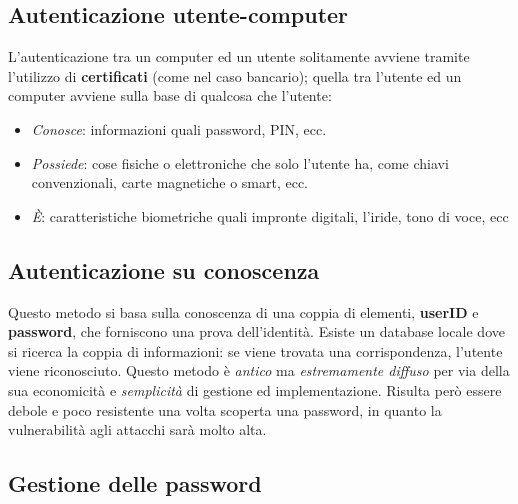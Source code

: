 \subsection{Autenticazione utente-computer}

L’autenticazione tra un computer ed un utente solitamente avviene tramite
l’utilizzo di \textbf{certificati} (come nel caso bancario); quella tra l’utente
ed un computer avviene sulla base di qualcosa che l’utente:

\begin{itemize}
      \item \textit{Conosce}: informazioni quali password, PIN, ecc.
      \item \textit{Possiede}: cose fisiche o elettroniche che solo l’utente ha,
            come chiavi convenzionali, carte magnetiche o smart, ecc.
      \item \textit{È}: caratteristiche biometriche quali
            impronte digitali, l’iride, tono di voce, ecc
\end{itemize}

\subsection{Autenticazione su conoscenza}

Questo metodo si basa sulla conoscenza di una coppia di elementi, \textbf{userID}
e \textbf{password}, che forniscono una prova dell’identità.
Esiste un database locale dove si ricerca la coppia di informazioni:
se viene trovata una corrispondenza, l’utente viene riconosciuto.
Questo metodo è \textit{antico} ma \textit{estremamente diffuso} per via della sua
economicità e \textit{semplicità} di gestione ed implementazione.
Risulta però essere debole e poco resistente una volta scoperta una password,
in quanto la vulnerabilità agli attacchi sarà molto alta.

\subsection{Gestione delle password}

